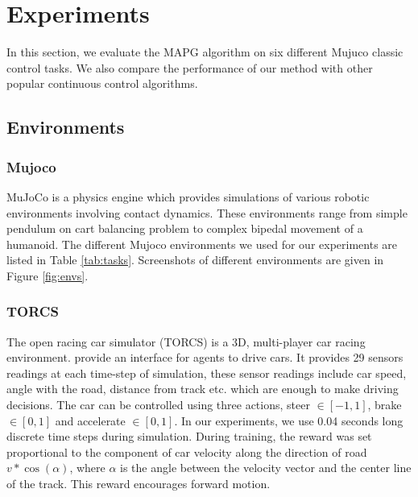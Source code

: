\chapter{Experiments}\label{chapter:experiments}
In this section, we evaluate the MAPG algorithm on six different Mujuco classic control tasks. We also compare the performance of our method with other popular continuous control algorithms. 

\section{Environments}

\subsection{Mujoco}
MuJoCo \cite{todorov2012mujoco} is a physics engine which provides simulations of various robotic environments involving contact dynamics. These environments range from simple pendulum on cart balancing problem to complex bipedal movement of a humanoid. The different Mujoco environments we used for our experiments are listed in Table \ref{tab:tasks}. Screenshots of different environments are given in Figure \ref{fig:envs}.

\subsection{TORCS}
The open racing car simulator (TORCS) is a 3D, multi-player car racing environment.  provide an interface for agents to drive cars. It provides 29 sensors readings at each time-step of simulation, these sensor readings include car speed, angle with the road, distance from track etc. which are enough to make driving decisions. The car can be controlled using three actions, steer $\in [-1, 1]$, brake $\in [0,1]$ and accelerate $\in [0,1]$. In our experiments, we use 0.04 seconds long discrete time steps during simulation. During training, the reward was set proportional to the component of car velocity along the direction of road $v*\cos(\alpha)$, where $\alpha$ is the angle between the velocity vector and the center line of the track. This reward encourages forward motion.

\newpage 

